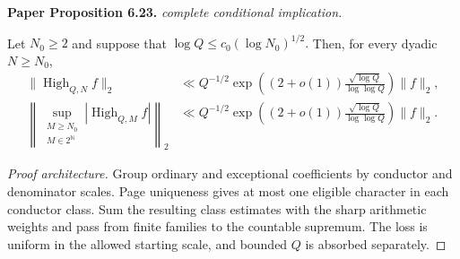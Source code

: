 \begin{lemma}
\label{prime_high}
\leanok
\par\medskip\noindent\textbf{Paper Proposition 6.23.} \textit{complete conditional implication.}\par
Let $N_0\geq2$ and suppose that $\log Q\leq c_0(\log N_0)^{1/2}.$
Then, for every dyadic $N\geq N_0$,
\begin{align}
 \|\operatorname{High}_{Q,N}f\|_2
 &\ll Q^{-1/2}
 \exp\left(
 (2+o(1))\frac{\sqrt{\log Q}}{\log\log Q}
 \right)\|f\|_2,
 \\
 \left\|
 \sup_{\substack{M\geq N_0\\M\in2^{\mathbb N}}}
 |\operatorname{High}_{Q,M}f|
 \right\|_2
 &\ll Q^{-1/2}
 \exp\left(
 (2+o(1))\frac{\sqrt{\log Q}}{\log\log Q}
 \right)\|f\|_2.
\end{align}
\end{lemma}
\begin{proof}[Proof architecture]
\leanok
Group ordinary and exceptional coefficients by conductor and denominator scales. Page uniqueness gives at most one eligible character in each conductor class. Sum the resulting class estimates with the sharp arithmetic weights and pass from finite families to the countable supremum. The loss is uniform in the allowed starting scale, and bounded $Q$ is absorbed separately.
\end{proof}

